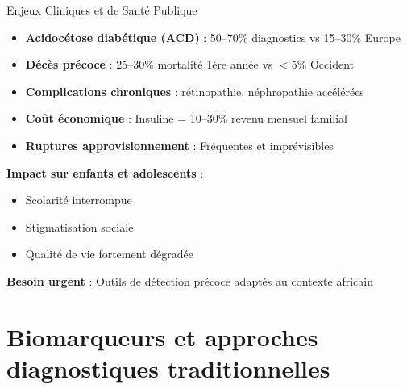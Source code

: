 \documentclass[11pt, aspectratio=169]{beamer}
\begin{document}
\begin{frame}{Enjeux Cliniques et de Santé Publique}
  \begin{tcolorbox}[colback=accent1!15, title=\textbf{\small Conséquences du diagnostic tardif}]
    \begin{itemize}
      \item \textbf{Acidocétose diabétique (ACD)} : 50--70\% diagnostics vs 15--30\% Europe
      \item \textbf{Décès précoce} : 25--30\% mortalité 1ère année vs $<5\%$ Occident
      \item \textbf{Complications chroniques} : rétinopathie, néphropathie accélérées
      \item \textbf{Coût économique} : Insuline = 10--30\% revenu mensuel familial
      \item \textbf{Ruptures approvisionnement} : Fréquentes et imprévisibles
    \end{itemize}
  \end{tcolorbox}
  
  \vspace{0.8em}
  
  \textbf{\color{accent2} Impact sur enfants et adolescents} :
  \begin{itemize}
    \item Scolarité interrompue
    \item Stigmatisation sociale
    \item Qualité de vie fortement dégradée
  \end{itemize}
  
  \vspace{0.6em}
  
  \textbf{\textcolor{accent1}{Besoin urgent}} : Outils de détection précoce adaptés au contexte africain
\end{frame}

\section{Biomarqueurs et approches diagnostiques traditionnelles}
\end{document}
